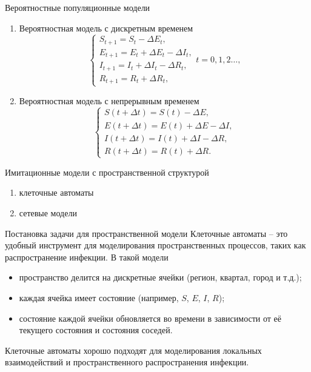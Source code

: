 \documentclass[notheorems]{beamer}
\begin{document}

\begin{frame}
	{Вероятностные популяционные модели}
	\begin{enumerate}
		\item Вероятностная модель с дискретным временем
		\begin{equation}
			\begin{cases}
				S_{t+1} = S_t - \Delta E_t,\\
				E_{t+1} = E_t +\Delta E_t - \Delta I_t,\\
				I_{t+1} = I_t + \Delta I_t - \Delta R_t,\\
				R_{t+1} = R_t + \Delta R_t,
			\end{cases}
			t = 0,1,2\ldots,
		\end{equation}
		\item Вероятностная модель с непрерывным временем
		\begin{equation}
			\begin{cases}
				S(t+\Delta t) = S(t) - \Delta E,\\
				E(t+\Delta t) = E(t) + \Delta E - \Delta I,\\
				I(t + \Delta t) = I(t) + \Delta I - \Delta R,\\
				R(t + \Delta t) = R(t) + \Delta R.
			\end{cases}
		\end{equation}
	\end{enumerate}
\end{frame}


\begin{frame}
	{Имитационные модели с пространственной структурой}
	\begin{enumerate}
		\item клеточные автоматы
		\item сетевые модели
	\end{enumerate}
\end{frame}


\begin{frame}
	{Постановка задачи для пространственной модели}
	Клеточные автоматы -- это удобный инструмент для моделирования пространственных процессов, таких как распространение инфекции. В такой модели
	
	\begin{itemize}
		\item пространство делится на дискретные ячейки (регион, квартал, город и т.д.);
		\item каждая ячейка имеет состояние (например, $S$, $E$, $I$, $R$);
		\item состояние каждой ячейки обновляется во времени в зависимости от её текущего состояния и состояния соседей.
	\end{itemize}
	
	Клеточные автоматы хорошо подходят для моделирования локальных взаимодействий и пространственного распространения инфекции.
\end{frame}
\end{document}
